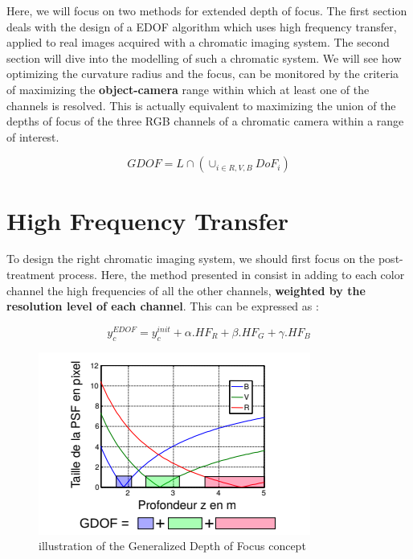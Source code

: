 \documentclass[10pt,letterpaper]{article}
\begin{document}
Here, we will focus on two methods for extended depth of focus. The first section deals with the design of a EDOF algorithm which uses high frequency transfer, applied to real images acquired with a chromatic imaging system. The second section will dive into the modelling of such a chromatic system. We will see how optimizing the curvature radius and the focus, can be monitored by the criteria of maximizing the \textbf{object-camera} range within which at least one of the channels is resolved. This is actually equivalent to maximizing the union of the depths of focus of the three RGB channels of a chromatic camera within a range of interest.

\begin{equation}\label{eqn:gdof}
    G D O F=L \cap\left(\cup_{i \in R, V, B} D o F_i\right)
\end{equation}


\section{High Frequency Transfer}
To design the right chromatic imaging system, we should first focus on the post-treatment process. Here, the method presented in \cite{TNT+08}consist in adding to each color channel the high frequencies of all the other channels, \textbf{weighted by the resolution level of each channel}. This can be expressed as :

\begin{equation}\label{eqn:HFT}
    y_{c}^{EDOF} = y_{c}^{init} + \alpha . HF_R + \beta . HF_G + \gamma . HF_B
\end{equation}


\begin{figure}[h]
	\centering
	\includegraphics[scale=0.7]{HFRs.png}
	\caption{illustration of the Generalized Depth of Focus concept}
	\label{fig:gdof}
\end{figure}
\end{document}
